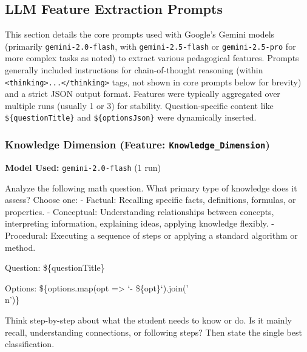 \documentclass[
    a4paper, %
    10pt, %
    twoside, %
]{LTJournalArticle}
\begin{document}
\subsection{LLM Feature Extraction Prompts}
\label{app:llm_prompts}
This section details the core prompts used with Google's Gemini models (primarily \texttt{gemini-2.0-flash}, with \texttt{gemini-2.5-flash} or \texttt{gemini-2.5-pro} for more complex tasks as noted) to extract various pedagogical features. Prompts generally included instructions for chain-of-thought reasoning (within \texttt{<thinking>...</thinking>} tags, not shown in core prompts below for brevity) and a strict JSON output format. Features were typically aggregated over multiple runs (usually 1 or 3) for stability. Question-specific content like \texttt{\$\{questionTitle\}} and \texttt{\$\{optionsJson\}} were dynamically inserted.

\subsubsection{Knowledge Dimension (Feature: \texttt{Knowledge\_Dimension})}
\label{app:prompt_knowledge_dimension}
\textbf{Model Used:} \texttt{gemini-2.0-flash} (1 run)
\begin{promptbox}
Analyze the following math question. What primary type of knowledge does it assess? Choose one:
- Factual: Recalling specific facts, definitions, formulas, or properties.
- Conceptual: Understanding relationships between concepts, interpreting information, explaining ideas, applying knowledge flexibly.
- Procedural: Executing a sequence of steps or applying a standard algorithm or method.

Question:
\$\{questionTitle\}

Options:
\$\{options.map(opt => `- \$\{opt\}`).join('\\n')\}

Think step-by-step about what the student needs to know or do. Is it mainly recall, understanding connections, or following steps? Then state the single best classification.
\end{promptbox}
\end{document}

